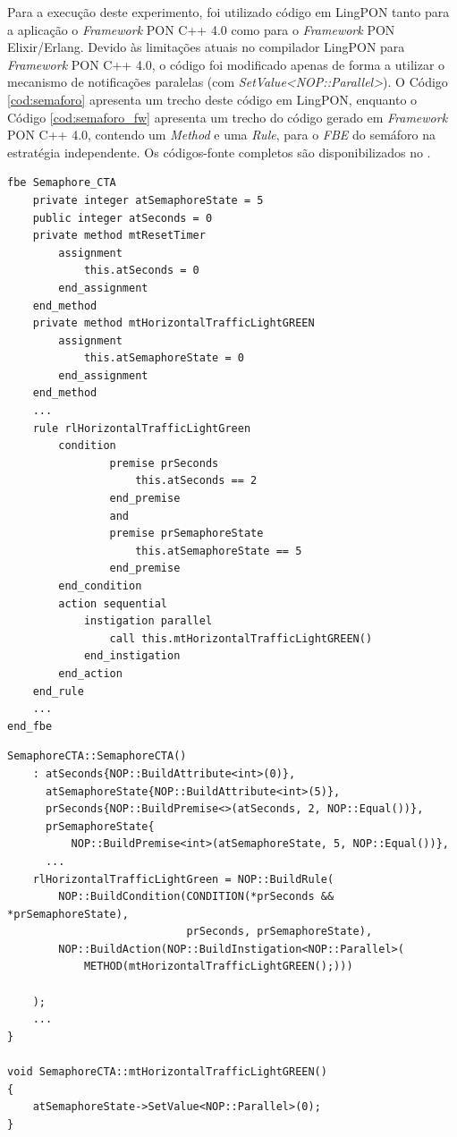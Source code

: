 Para a execução deste experimento, foi utilizado código em LingPON tanto para a
aplicação o \textit{Framework} PON C++ 4.0 como para o \textit{Framework} PON
Elixir/Erlang. Devido às limitações atuais no compilador LingPON para
\textit{Framework} PON C++ 4.0, o código foi modificado apenas de forma a
utilizar o mecanismo de notificações paralelas (com
\textit{SetValue<NOP::Parallel>}). O Código \ref{cod:semaforo} apresenta um
trecho deste código em LingPON, enquanto o Código \ref{cod:semaforo_fw}
apresenta um trecho do código gerado em \textit{Framework} PON C++ 4.0, contendo
um \textit{Method} e uma \textit{Rule}, para o \textit{FBE} do semáforo na
estratégia independente. Os códigos-fonte completos são disponibilizados no
.

\begin{lstlisting}[caption = {Trecho do FBE para o CTA na estratégia independente em LingPON},
  source = {Autoria própria}, float=htb, language=nopl,
  label = {cod:semaforo},
]
fbe Semaphore_CTA
    private integer atSemaphoreState = 5
    public integer atSeconds = 0
    private method mtResetTimer
        assignment
            this.atSeconds = 0
        end_assignment
    end_method
    private method mtHorizontalTrafficLightGREEN
        assignment
            this.atSemaphoreState = 0
        end_assignment
    end_method    
    ...
    rule rlHorizontalTrafficLightGreen
        condition
                premise prSeconds
                    this.atSeconds == 2
                end_premise
                and
                premise prSemaphoreState
                    this.atSemaphoreState == 5
                end_premise
        end_condition
        action sequential
            instigation parallel
                call this.mtHorizontalTrafficLightGREEN()
            end_instigation
        end_action
    end_rule
    ...
end_fbe
\end{lstlisting}

\begin{lstlisting}[caption = {Trecho do FBE para o CTA na estratégia independente em \textit{Framework} PON C++ 4.0},
  source = {Autoria própria}, float=htb,
  label = {cod:semaforo_fw},
]
SemaphoreCTA::SemaphoreCTA()
    : atSeconds{NOP::BuildAttribute<int>(0)},
      atSemaphoreState{NOP::BuildAttribute<int>(5)},
      prSeconds{NOP::BuildPremise<>(atSeconds, 2, NOP::Equal())},
      prSemaphoreState{
          NOP::BuildPremise<int>(atSemaphoreState, 5, NOP::Equal())},
      ...
    rlHorizontalTrafficLightGreen = NOP::BuildRule(
        NOP::BuildCondition(CONDITION(*prSeconds && *prSemaphoreState),
                            prSeconds, prSemaphoreState),
        NOP::BuildAction(NOP::BuildInstigation<NOP::Parallel>(
            METHOD(mtHorizontalTrafficLightGREEN();)))

    );
    ...
}

void SemaphoreCTA::mtHorizontalTrafficLightGREEN()
{
    atSemaphoreState->SetValue<NOP::Parallel>(0);
}
\end{lstlisting}

